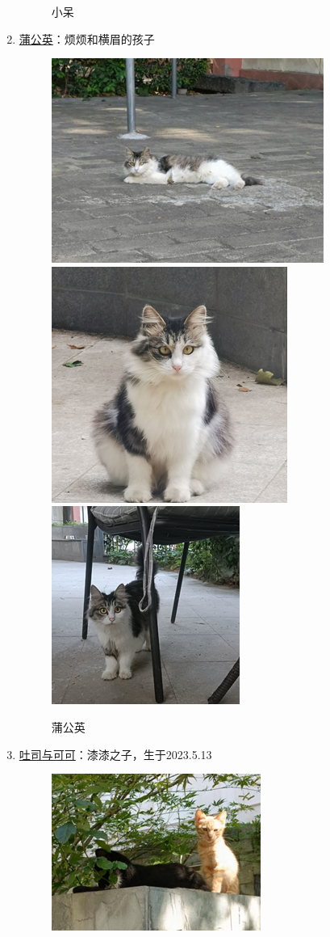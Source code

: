 \documentclass[zihao=-4,fontset=none]{Beautybook-CN}
\begin{document}
\begin{enumerate}
\begin{figure}[htbp]
            \caption{小呆}
            \label{img910}
    \end{figure}
        \item \hyperref[img111213]{蒲公英}：烦烦和横眉的孩子
    \begin{figure}[htbp]
            \centering
            \includegraphics[width=0.4\linewidth]{media/cimage11.png}
        \qquad
            \includegraphics[width=0.4\linewidth]{media/cimage12.png}\\
            \includegraphics[width=0.4\linewidth]{media/cimage13.png}
            \caption{蒲公英}
            \label{img111213}
    \end{figure}
        \item \hyperref[img141516]{吐司与可可}：漆漆之子，生于2023.5.13
    \begin{figure}[htbp]
            \centering
            \includegraphics[width=0.4\linewidth]{media/cimage14.png}

\end{figure}
\end{enumerate}
\end{document}
